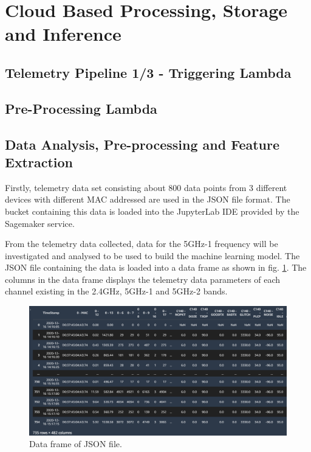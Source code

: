 \section{Cloud Based Processing, Storage and Inference}
\subsection{Telemetry Pipeline 1/3 - Triggering Lambda}
\subsection{Pre-Processing Lambda}

\subsection{Data Analysis, Pre-processing and Feature Extraction} 

Firstly, telemetry data set consisting about 800 data points from 3 different devices with different MAC addressed are used in the JSON file format. The bucket containing this data is loaded into the JupyterLab IDE provided by the Sagemaker service.
 
From the telemetry data collected, data for the 5GHz-1 frequency will be investigated and analysed to be used to build the machine learning model. 
The JSON file containing the data is loaded into a data frame as shown in fig. \ref{fig_df}. The columns in the data frame displays the telemetry data parameters of each channel existing in the 2.4GHz, 5GHz-1 and 5GHz-2 bands.

\begin{figure}[ht]
    \centering
    \includegraphics[scale=0.53]{pages/Chapter4/Chapter 4 Images/Dataframe.PNG}
    \caption{Data frame of JSON file.}
    \label{fig_df}
\end{figure}

